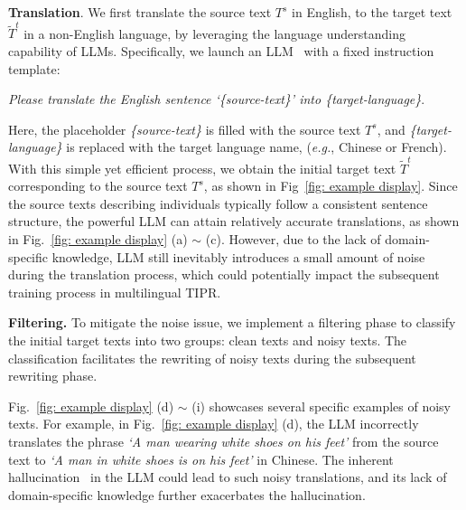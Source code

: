 \documentclass[10pt,journal,compsoc]{IEEEtran}
\begin{document}
\textbf{Translation}. 
We first translate the source text $T^s$ in English, to the target text $\widetilde{T}^t$ in a non-English language, by leveraging the language understanding capability of LLMs. Specifically, we launch an LLM~\cite{bai2023qwen, dubey2024llama} with a fixed instruction template:

\begin{tcolorbox}
\textit{Please translate the English sentence `\{source-text\}' into \{target-language\}}. 
\end{tcolorbox}

Here, the placeholder \textit{\{source-text\}} is filled with the source text \(T^s\), and \textit{\{target-language\}} is replaced with the target language name, (\emph{e.g.}, Chinese or French). With this simple yet efficient process, we obtain the initial target text \(\widetilde{T}^t\) corresponding to the source text \(T^s\), as shown in Fig~\ref{fig: example display}. 
Since the source texts describing individuals typically follow a consistent sentence structure, the powerful LLM can attain relatively accurate translations, as shown in Fig.~\ref{fig: example display} (a) \(\sim\) (c). 
However, due to the lack of domain-specific knowledge, LLM still inevitably introduces a small amount of noise during the translation process, which could potentially impact the subsequent training process in multilingual TIPR. 

\textbf{Filtering.}
To mitigate the noise issue, we implement a filtering phase to classify the initial target texts into two groups: clean texts and noisy texts. The classification facilitates the rewriting of noisy texts during the subsequent rewriting phase.

Fig.~\ref{fig: example display} (d) \(\sim\) (i) showcases several specific examples of noisy texts.
For example, in Fig.~\ref{fig: example display} (d), the LLM incorrectly translates the phrase \textit{`A man wearing white shoes on his feet'} from the source text to \textit{`A man in white shoes is on his feet'} in Chinese. 
The inherent hallucination~\cite{huang2023survey} in the LLM could lead to such noisy translations, and its lack of domain-specific knowledge further exacerbates the hallucination.
\end{document}
